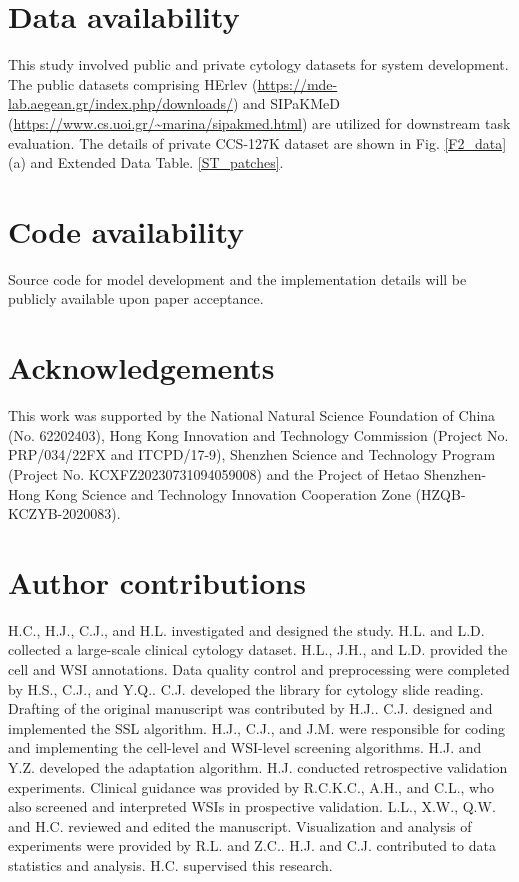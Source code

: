 \section*{Data availability}\label{sec5-1}
This study involved public and private cytology datasets for system development. The public datasets comprising HErlev (\url{https://mde-lab.aegean.gr/index.php/downloads/}) and SIPaKMeD (\url{https://www.cs.uoi.gr/~marina/sipakmed.html}) are utilized for downstream task evaluation.
The details of private CCS-127K dataset are shown in Fig. \ref{F2_data}(a) and Extended Data Table. \ref{ST_patches}. 

\section*{Code availability}\label{sec5-1}
Source code for model development and the implementation details
will be publicly available upon
paper acceptance. 

\section*{Acknowledgements}\label{sec5-1}
This work was supported by the National Natural Science Foundation of China (No. 62202403), Hong Kong Innovation and Technology Commission (Project No. PRP/034/22FX and ITCPD/17-9), Shenzhen Science and Technology Program (Project No. KCXFZ20230731094059008) and the Project of Hetao Shenzhen-Hong Kong Science and Technology Innovation Cooperation Zone (HZQB-KCZYB-2020083). 

\section*{Author contributions}\label{sec5-1}
H.C., H.J., C.J., and H.L. investigated and designed the study. H.L. and L.D. collected a large-scale clinical cytology dataset. H.L., J.H., and L.D. provided the cell and WSI annotations. Data quality control and preprocessing were completed by H.S., C.J., and Y.Q.. C.J. developed the library for cytology slide reading. Drafting of the original manuscript was contributed by H.J.. C.J. designed and implemented the SSL algorithm. H.J., C.J., and J.M. were responsible for coding and implementing the cell-level and WSI-level screening algorithms. H.J. and Y.Z. developed the adaptation algorithm. H.J. conducted retrospective validation experiments. Clinical guidance was provided by R.C.K.C., A.H., and C.L., who also screened and interpreted WSIs in prospective validation. L.L., X.W., Q.W. and H.C. reviewed and edited the manuscript. Visualization and analysis of experiments were provided by R.L. and Z.C.. H.J. and C.J. contributed to data statistics and analysis. H.C. supervised this research.

